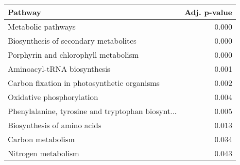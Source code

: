 \begin{tabular}{lr}
\toprule
                                           Pathway &  Adj. p-value \\
\midrule
                                Metabolic pathways &         0.000 \\
             Biosynthesis of secondary metabolites &         0.000 \\
              Porphyrin and chlorophyll metabolism &         0.000 \\
                       Aminoacyl-tRNA biosynthesis &         0.001 \\
       Carbon fixation in photosynthetic organisms &         0.002 \\
                         Oxidative phosphorylation &         0.004 \\
 Phenylalanine, tyrosine and tryptophan biosynt... &         0.005 \\
                       Biosynthesis of amino acids &         0.013 \\
                                 Carbon metabolism &         0.034 \\
                               Nitrogen metabolism &         0.043 \\
\bottomrule
\end{tabular}
